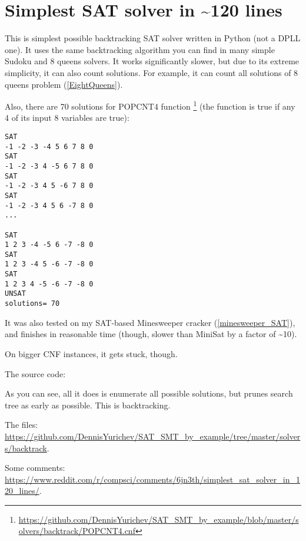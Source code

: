 \section{Simplest SAT solver in \textasciitilde{}120 lines}
\label{SAT_backtrack}

\renewcommand{\CURPATH}{solvers/backtrack}

This is simplest possible backtracking SAT solver written in Python (not a \ac{DPLL} one).
It uses the same backtracking algorithm you can find in many simple Sudoku and 8 queens solvers.
It works significantly slower, but due to its extreme simplicity, it can also count solutions.
For example, it can count all solutions of 8 queens problem (\ref{EightQueens}).

Also, there are 70 solutions for POPCNT4 function
\footnote{\url{https://github.com/DennisYurichev/SAT_SMT_by_example/blob/master/solvers/backtrack/POPCNT4.cnf}}
(the function is true if any 4 of its input 8 variables are true):

\begin{lstlisting}
SAT
-1 -2 -3 -4 5 6 7 8 0
SAT
-1 -2 -3 4 -5 6 7 8 0
SAT
-1 -2 -3 4 5 -6 7 8 0
SAT
-1 -2 -3 4 5 6 -7 8 0
...

SAT
1 2 3 -4 -5 6 -7 -8 0
SAT
1 2 3 -4 5 -6 -7 -8 0
SAT
1 2 3 4 -5 -6 -7 -8 0
UNSAT
solutions= 70
\end{lstlisting}

It was also tested on my SAT-based Minesweeper cracker (\ref{minesweeper_SAT}),
and finishes in reasonable time (though, slower than MiniSat by a factor of \textasciitilde{}10).

On bigger \ac{CNF} instances, it gets stuck, though.

The source code:



As you can see, all it does is enumerate all possible solutions, but prunes search tree as early as possible.
This is backtracking.

The files: \url{https://github.com/DennisYurichev/SAT_SMT_by_example/tree/master/solvers/backtrack}.

Some comments: \url{https://www.reddit.com/r/compsci/comments/6jn3th/simplest_sat_solver_in_120_lines/}.

